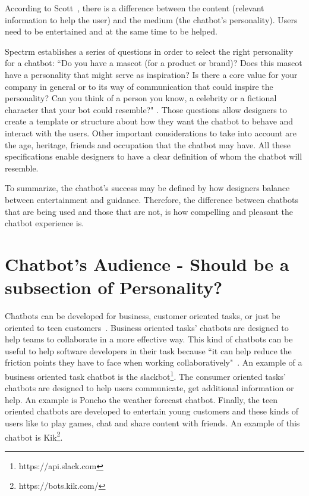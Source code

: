\documentclass[a4paper,10pt]{article}
\begin{document}
According to Scott~\cite{HeuristicsWebPage}, there is a difference between the content (relevant information to help the user) and the medium (the chatbot’s personality). Users need to be entertained and at the same time to be helped.      

Spectrm establishes a series of questions in order to select the right personality for a chatbot: ``Do you have a mascot (for a product or brand)? Does this mascot have a personality that might serve as inspiration? Is there a core value for your company in general or to its way of communication that could inspire the personality? Can you think of a person you know, a celebrity or a fictional character that your bot could resemble?" \cite{personality}. Those questions allow designers to create a template or structure about how they want the chatbot to behave and interact with the users. Other important considerations to take into account are the age, heritage, friends and occupation that the chatbot may have. All these specifications enable designers to have a clear definition of whom the chatbot will resemble.

To summarize, the chatbot’s success may be defined by how designers balance between entertainment and guidance. Therefore, the difference between chatbots that are being used and those that are not, is how compelling and pleasant the chatbot experience is.

\section{Chatbot's Audience - Should be a subsection of Personality?}

Chatbots can be developed for business, customer oriented tasks, or just be oriented to teen customers~\cite{Shevat2017}. Business oriented tasks' chatbots are designed to help teams to collaborate in a more effective way. This kind of chatbots can be useful to help software developers in their task because ``it can help reduce the friction points they have to face when working collaboratively"~\cite{lebeuf2017software}. An example of a business oriented task chatbot is the slackbot\footnote{https://api.slack.com}. The consumer oriented tasks' chatbots are designed to help users communicate, get additional information or help. An example is Poncho the weather forecast chatbot. Finally, the teen oriented chatbots are developed to entertain young customers and these kinds of users like to play games, chat and share content with friends. An example of this chatbot is Kik\footnote{https://bots.kik.com/}. 
\end{document}
